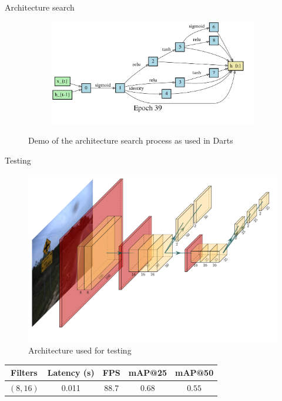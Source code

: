 \documentclass{beamer}
\begin{document}
\begin{frame}{Architecture search}
\begin{figure}
\begin{center}
\begin{subfigure}[t]{.45\linewidth}
        \end{subfigure}
        \begin{subfigure}[t]{.45\linewidth}
          \centering
          \includegraphics[width=0.99\linewidth]{figures/darts_progress_recurrent-39.png}
        \end{subfigure}
        \caption{Demo of the architecture search process as used in Darts \cite{liu2018darts}}
      \end{center}
    \end{figure}
\end{frame}{}

\begin{frame}{Testing}
    \begin{figure}
        \centering
        \includegraphics[width=0.6\linewidth]{figures/my_arch.pdf}
        \caption{Architecture used for testing}
    \end{figure}{}
    \begin{table}[]
        \centering
        \begin{tabular}{|c|c|c|c|c|}
            \hline
            Filters & Latency (s) & FPS & mAP@25 & mAP@50 \\ \hline
            $(8,16)$ & 0.011 & 88.7 & $0.68$ & $0.55$ \\ \hline
        \end{tabular}
    \end{table}{}
\end{frame}{}
\end{document}
